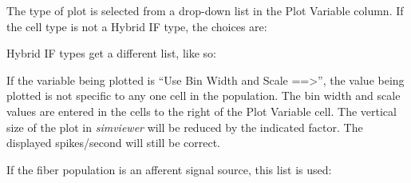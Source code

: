 \documentclass[12pt,openany,oneside]{book}
\newcommand{\prog}[1]{\textit{{#1}}}
\newcommand{\inquotes}[1]{{{``#1''}}}
\begin{document}
\begin{samepage}
The type of plot is selected from a drop-down list in the Plot Variable
column. If the cell type is not a Hybrid IF type, the choices are:
\bigskip


\bigskip
Hybrid IF types get a different list, like so:

\end{samepage}
\bigskip


If the variable being plotted is \inquotes{Use Bin Width and Scale
==\textgreater}, the value being plotted is not specific to any one cell in
the population. The bin width and scale values are entered in the cells
to the right of the Plot Variable cell. The vertical size of the plot in
\prog{simviewer} will be reduced by the indicated factor. The displayed
spikes/second will still be correct.

If the fiber population is an afferent signal source, this list is used:
\bigskip


\bigskip
\end{document}
